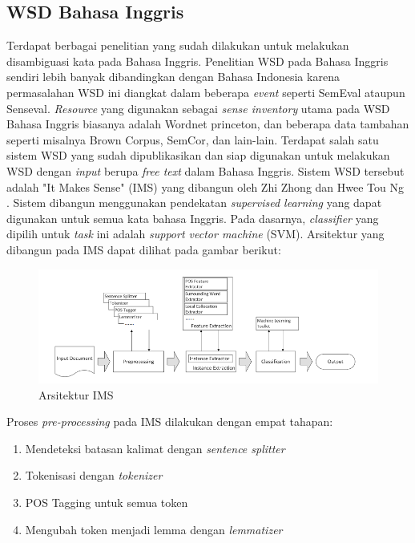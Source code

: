 \subsection{WSD Bahasa Inggris}
Terdapat berbagai penelitian yang sudah dilakukan untuk melakukan disambiguasi kata pada Bahasa Inggris. Penelitian WSD pada Bahasa Inggris sendiri lebih banyak dibandingkan dengan Bahasa Indonesia karena permasalahan WSD ini diangkat dalam beberapa \textit{event} seperti SemEval ataupun Senseval. \textit{Resource} yang digunakan sebagai \textit{sense inventory} utama pada WSD Bahasa Inggris biasanya adalah Wordnet princeton, dan beberapa data tambahan seperti misalnya Brown Corpus, SemCor, dan lain-lain. Terdapat salah satu sistem WSD yang sudah dipublikasikan dan siap digunakan untuk melakukan WSD dengan \textit{input} berupa \textit{free text} dalam Bahasa Inggris. Sistem WSD tersebut adalah "It Makes Sense" (IMS) yang dibangun oleh Zhi Zhong dan Hwee Tou Ng \citep{zhong2010makes}. Sistem  dibangun menggunakan pendekatan \textit{supervised learning} yang dapat digunakan untuk semua kata bahasa Inggris. Pada dasarnya, \textit{classifier} yang dipilih untuk \textit{task} ini adalah \textit{support vector machine} (SVM). Arsitektur yang dibangun pada IMS dapat dilihat pada gambar berikut:

\begin{figure}
	\centering
	\includegraphics[width=1\linewidth]{adit_pics/Arsitektur-IMS}
	\caption{Arsitektur IMS}
	\label{fig:Arsitektur-IMS}
\end{figure}

Proses \textit{pre-processing} pada IMS dilakukan dengan empat tahapan:
\begin{enumerate}
	\item Mendeteksi batasan kalimat dengan \textit{sentence splitter}
	\item Tokenisasi dengan \textit{tokenizer}
	\item POS Tagging untuk semua token
	\item Mengubah token menjadi lemma dengan \textit{lemmatizer}
\end{enumerate}

